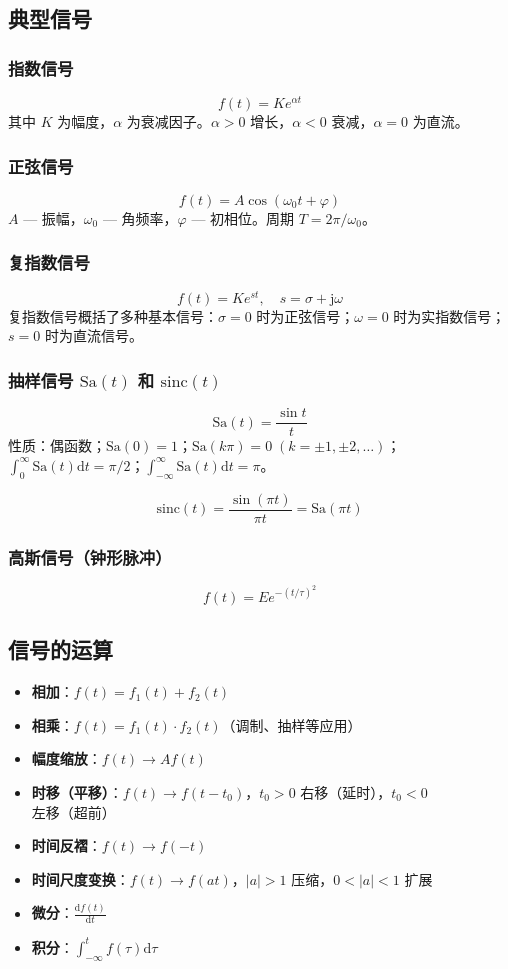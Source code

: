 \documentclass[11pt,a4paper]{ctexart}
\newcommand{\jj}{\mathrm{j}}            %
\newcommand{\dd}{\mathrm{d}}            %
\newcommand{\Sa}{\mathrm{Sa}}           %
\newcommand{\sinc}{\mathrm{sinc}}       %
\begin{document}
\subsection{典型信号}

\subsubsection{指数信号}
\[
f(t) = K e^{\alpha t}
\]
其中 $K$ 为幅度，$\alpha$ 为衰减因子。$\alpha > 0$ 增长，$\alpha < 0$ 衰减，$\alpha = 0$ 为直流。

\subsubsection{正弦信号}
\[
f(t) = A \cos(\omega_0 t + \varphi)
\]
$A$ — 振幅，$\omega_0$ — 角频率，$\varphi$ — 初相位。周期 $T = 2\pi/\omega_0$。

\subsubsection{复指数信号}
\[
f(t) = K e^{st}, \quad s = \sigma + \jj\omega
\]
复指数信号概括了多种基本信号：$\sigma = 0$ 时为正弦信号；$\omega = 0$ 时为实指数信号；$s = 0$ 时为直流信号。

\subsubsection{抽样信号 $\Sa(t)$ 和 $\sinc(t)$}
\[
\Sa(t) = \frac{\sin t}{t}
\]
性质：偶函数；$\Sa(0) = 1$；$\Sa(k\pi) = 0\;(k = \pm 1,\pm 2,\ldots)$；$\int_{0}^{\infty} \Sa(t)\dd t = \pi/2$；$\int_{-\infty}^{\infty} \Sa(t)\dd t = \pi$。

\[
\sinc(t) = \frac{\sin(\pi t)}{\pi t} = \Sa(\pi t)
\]

\subsubsection{高斯信号（钟形脉冲）}
\[
f(t) = E e^{-(t/\tau)^2}
\]

\subsection{信号的运算}

\begin{itemize}
    \item \textbf{相加}：$f(t) = f_1(t) + f_2(t)$
    \item \textbf{相乘}：$f(t) = f_1(t) \cdot f_2(t)$（调制、抽样等应用）
    \item \textbf{幅度缩放}：$f(t) \to A f(t)$
    \item \textbf{时移（平移）}：$f(t) \to f(t - t_0)$，$t_0 > 0$ 右移（延时），$t_0 < 0$ 左移（超前）
    \item \textbf{时间反褶}：$f(t) \to f(-t)$
    \item \textbf{时间尺度变换}：$f(t) \to f(at)$，$|a| > 1$ 压缩，$0 < |a| < 1$ 扩展
    \item \textbf{微分}：$\frac{\dd f(t)}{\dd t}$
    \item \textbf{积分}：$\int_{-\infty}^{t} f(\tau)\dd\tau$
\end{itemize}
\end{document}
